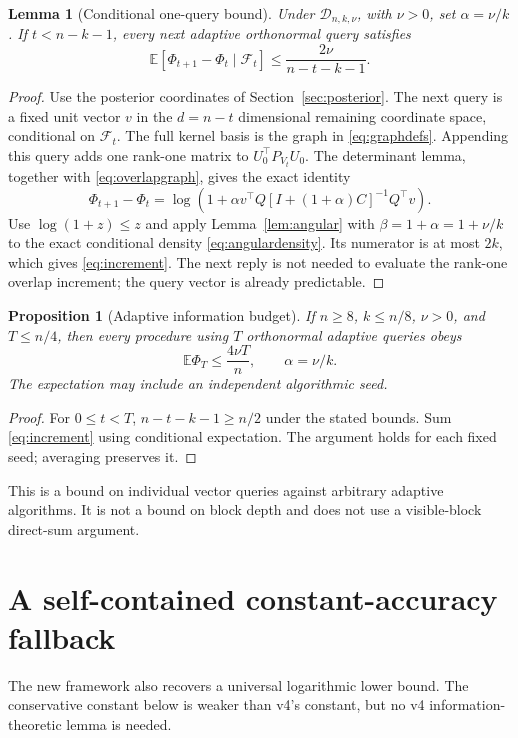 \documentclass[11pt]{article}
\numberwithin{equation}{section}
\newtheorem{lemma}[theorem]{Lemma}
\newtheorem{proposition}[theorem]{Proposition}
\theoremstyle{remark}\newtheorem{remark}[theorem]{Remark}
\newcommand{\E}{\mathbb E}
\newcommand{\calD}{\mathcal D}
\newcommand{\calF}{\mathcal F}
\begin{document}
\begin{lemma}[Conditional one-query bound]\label{lem:increment}
Under $\calD_{n,k,\nu}$, with $\nu>0$, set $\alpha=\nu/k$. If $t<n-k-1$, every next adaptive orthonormal query satisfies
\begin{equation}\label{eq:increment}
\E[\Phi_{t+1}-\Phi_t\mid\calF_t]
\le\frac{2\nu}{n-t-k-1}.
\end{equation}
\end{lemma}
\begin{proof}
Use the posterior coordinates of Section~\ref{sec:posterior}. The next query is a fixed unit vector $v$ in the $d=n-t$ dimensional remaining coordinate space, conditional on $\calF_t$. The full kernel basis is the graph in \eqref{eq:graphdefs}. Appending this query adds one rank-one matrix to $U_0^\top P_{V_t}U_0$. The determinant lemma, together with \eqref{eq:overlapgraph}, gives the exact identity
\begin{equation}\label{eq:exactincrement}
\Phi_{t+1}-\Phi_t
=\log\!\left(1+\alpha v^\top Q[I+(1+\alpha)C]^{-1}Q^\top v\right).
\end{equation}
Use $\log(1+z)\le z$ and apply Lemma~\ref{lem:angular} with $\beta=1+\alpha=1+\nu/k$ to the exact conditional density \eqref{eq:angulardensity}. Its numerator is at most $2k$, which gives \eqref{eq:increment}. The next reply is not needed to evaluate the rank-one overlap increment; the query vector is already predictable.
\end{proof}

\begin{proposition}[Adaptive information budget]\label{prop:budget}
If $n\ge8$, $k\le n/8$, $\nu>0$, and $T\le n/4$, then every procedure using $T$ orthonormal adaptive queries obeys
\begin{equation}\label{eq:budget}
\E\Phi_T\le\frac{4\nu T}{n},\qquad \alpha=\nu/k.
\end{equation}
The expectation may include an independent algorithmic seed.
\end{proposition}
\begin{proof}
For $0\le t<T$, $n-t-k-1\ge n/2$ under the stated bounds. Sum \eqref{eq:increment} using conditional expectation. The argument holds for each fixed seed; averaging preserves it.
\end{proof}
This is a bound on individual vector queries against arbitrary adaptive algorithms. It is not a bound on block depth and does not use a visible-block direct-sum argument.

\section{A self-contained constant-accuracy fallback}\label{sec:constant}
The new framework also recovers a universal logarithmic lower bound. The conservative constant below is weaker than v4's constant, but no v4 information-theoretic lemma is needed.
\end{document}
